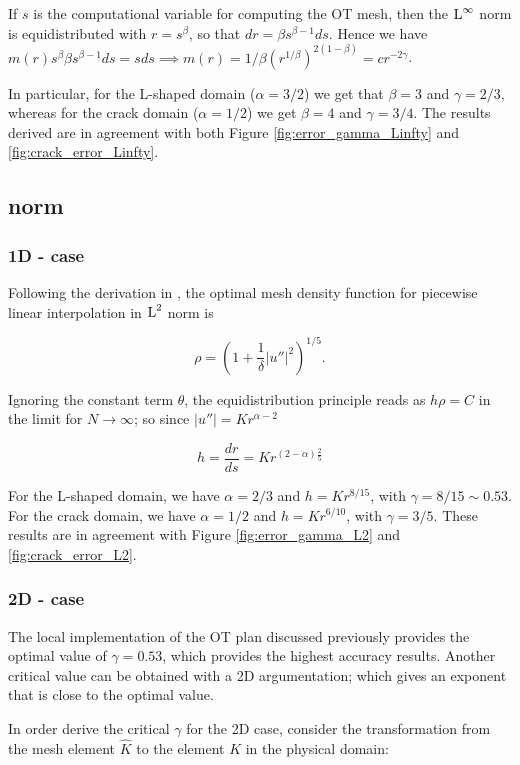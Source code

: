 \documentclass[a4paper,11pt]{article}
\begin{document}
{If $s$ is the computational variable for computing the OT mesh, then the $\operatorname L^{\infty}$ norm is equidistributed with $r = s^{\beta}$, so that $dr = \beta s^{\beta - 1} ds$. Hence we have $m(r) s^{\beta} \beta s^{\beta-1} ds = s ds \implies m(r) = 1/\beta (r^{1/\beta})^{2(1-\beta)} = c r^{-2\gamma}$.

In particular, for the L-shaped domain ($\alpha = 3/2$) we get that $\beta = 3$ and $\gamma = 2/3$, whereas for the crack domain ($\alpha = 1/2$) we get $\beta = 4$ and $\gamma = 3/4$. The results derived are in agreement with both Figure \ref{fig:error_gamma_Linfty} and \ref{fig:crack_error_Linfty}.  

\subsection{ norm}

\subsubsection{1D - case}

Following the derivation in \cite{HR:2011}, the optimal mesh density function for piecewise linear interpolation in $\operatorname L^{2}$ norm is

$$\rho = \left(1 + \frac{1}{\delta}|u''|^{2} \right)^{1/5}.$$

Ignoring the constant term $\theta$, the equidistribution principle reads as $h\rho = C$ in the limit for $N \rightarrow \infty$; so since $|u''| = Kr^{\alpha - 2}$

$$h = \frac{dr}{ds} = K r^{(2 -\alpha)\frac{2}{5}}$$

For the L-shaped domain, we have $\alpha = 2/3$ and $h = K r^{8/15}$, with $\gamma = 8/15 \sim 0.53$. For the crack domain, we have $\alpha = 1/2$ and  $h = K r^{6/10}$, with $\gamma = 3/5$. These results are in agreement with Figure \ref{fig:error_gamma_L2} and \ref{fig:crack_error_L2}. 


\subsubsection{2D - case}

The local implementation of the OT plan discussed previously provides the optimal value of $\gamma = 0.53$, which provides the highest accuracy results. Another critical value can be obtained with a 2D argumentation; which gives an exponent that is close to the optimal value.

In order derive the critical $\gamma$ for the 2D case, consider the transformation from the mesh element $\widehat{K}$ to the element $K$ in the physical domain:

}
\end{document}

